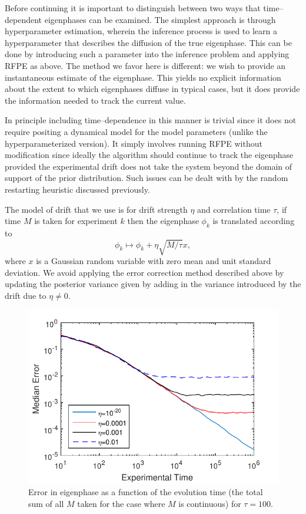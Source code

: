 \documentclass[aps,pra,amsmath,twocolumn,amssymb,superscriptaddress]{revtex4-1}
\begin{document}
Before continuing it is important to distinguish between two ways that time--dependent eigenphases can be examined.  The simplest approach is through hyperparameter estimation, wherein the inference process is used to learn a hyperparameter that describes the diffusion of the true eigenphase.  This can be done by introducing such a parameter into the inference problem and applying RFPE as above.  The method we favor here is different: we wish to provide an instantaneous estimate of the eigenphase.  This yields no explicit information about the extent to which eigenphases diffuse in typical cases, but it does provide the information needed to track the current value.

In principle including time--dependence in this manner is trivial since it does not require positing a dynamical model for the model parameters (unlike the hyperparameterized version).
It simply involves running RFPE without modification since ideally the algorithm should continue to track the eigenphase provided the experimental drift does not take the system beyond the 
domain of support of the prior distribution.  Such issues can be dealt with by the random restarting heuristic discussed previously.

The model of drift that we use is for drift strength $\eta$ and correlation time $\tau$, if time $M$ is taken for experiment $k$ then the eigenphase $\phi_k$ is translated according to
\begin{equation}
\phi_k \mapsto \phi_k + \eta\sqrt{M/\tau}x,
\end{equation}
where $x$ is a Gaussian random variable with zero mean and unit standard deviation.  We avoid applying the error correction method described above by updating the posterior variance given by adding in the variance introduced by the drift due to $\eta \ne 0$.

\begin{figure}
\includegraphics[width=0.6\linewidth]{Timedep.pdf}
\caption{Error in eigenphase as a function of the evolution time (the total sum of all $M$ taken for the case where $M$ is continuous) for $\tau=100$.}\label{fig:Timedep}
\end{figure}
\end{document}
